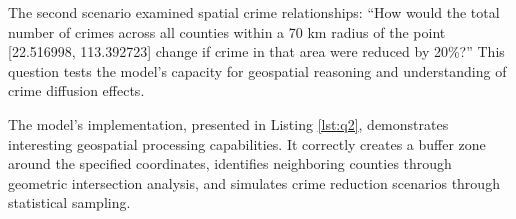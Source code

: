 The second scenario examined spatial crime relationships: ``How would the total number of crimes across all counties within a 70 km radius of the point [22.516998, 113.392723] change if crime in that area were reduced by 20\%?'' This question tests the model's capacity for geospatial reasoning and understanding of crime diffusion effects.

The model's implementation, presented in Listing \ref{lst:q2}, demonstrates interesting geospatial processing capabilities. It correctly creates a buffer zone around the specified coordinates, identifies neighboring counties through geometric intersection analysis, and simulates crime reduction scenarios through statistical sampling.





